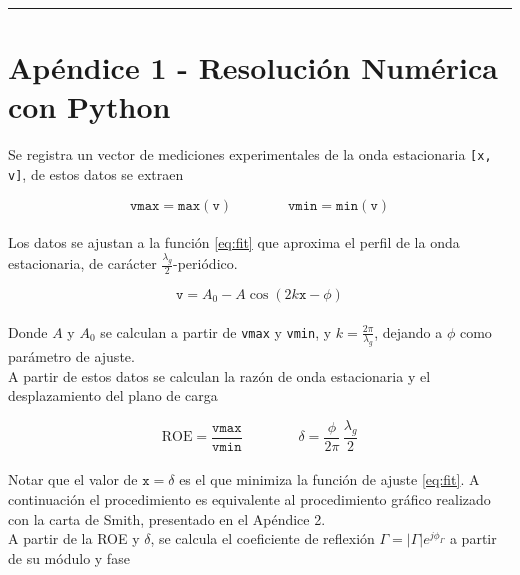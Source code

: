 \documentclass[11pt,a4paper]{article}
\begin{document}
\newpage
\begin{appendices}
\vspace{-1em}
\hrule
\vspace{1em}
\normalsize
\section{Apéndice 1 - Resolución Numérica con Python}
\begin{multicols}{2}
    Se registra un vector de mediciones experimentales de la onda estacionaria \texttt{[x, v]}, de estos datos se extraen

    \begin{equation}
        \mathtt{vmax} = \mathtt{max(v)} \qquad \qquad \mathtt{vmin} = \mathtt{min(v)}
    \end{equation}\\[-1em]

    Los datos se ajustan a la función \ref{eq:fit} que aproxima el perfil de la onda estacionaria, de carácter $\frac{\lambda_g}{2}$-periódico.

    \begin{equation}\label{eq:fit}
        \mathtt v = A_0 -A\cos(2k\mathtt x-\phi)
    \end{equation}\\[-1em]

    Donde $A$ y $A_0$ se calculan a partir de \texttt{vmax} y \texttt{vmin}, y $k = \frac{2\pi}{\lambda_g}$, dejando a $\phi$ como parámetro de ajuste.\\

    A partir de estos datos se calculan la razón de onda estacionaria y el desplazamiento del plano de carga

    \begin{equation}
        \mathrm{ROE} = \frac{\mathtt{vmax}}{\mathtt{vmin}}\qquad\qquad\delta = \frac{\phi}{2\pi}\,\frac{\lambda_g}{2}
    \end{equation}\\[-1em]

    Notar que el valor de $\mathtt{x} = \delta$ es el que minimiza la función de ajuste \ref{eq:fit}. A continuación el procedimiento es equivalente al procedimiento gráfico realizado con la carta de Smith, presentado en el Apéndice 2.\\

    A partir de la ROE y $\delta$, se calcula el coeficiente de reflexión $\Gamma = \left|\Gamma\right|e^{j\phi_\Gamma}$ a partir de su módulo y fase


\end{multicols}
\end{appendices}
\end{document}
